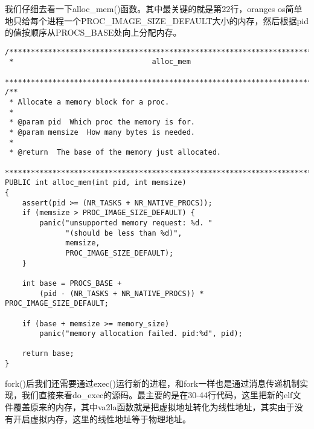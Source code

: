 \documentclass{whureport}
\begin{document}
我们仔细去看一下alloc\_mem()函数。其中最关键的就是第22行，oranges os简单地只给每个进程一个PROC\_IMAGE\_SIZE\_DEFAULT大小的内存，然后根据pid的值按顺序从PROCS\_BASE处向上分配内存。

\begin{lstlisting}
/*****************************************************************************
 *                                alloc_mem
 *****************************************************************************/
/**
 * Allocate a memory block for a proc.
 * 
 * @param pid  Which proc the memory is for.
 * @param memsize  How many bytes is needed.
 * 
 * @return  The base of the memory just allocated.
 *****************************************************************************/
PUBLIC int alloc_mem(int pid, int memsize)
{
	assert(pid >= (NR_TASKS + NR_NATIVE_PROCS));
	if (memsize > PROC_IMAGE_SIZE_DEFAULT) {
		panic("unsupported memory request: %d. "
		      "(should be less than %d)",
		      memsize,
		      PROC_IMAGE_SIZE_DEFAULT);
	}

	int base = PROCS_BASE +
		(pid - (NR_TASKS + NR_NATIVE_PROCS)) * PROC_IMAGE_SIZE_DEFAULT;

	if (base + memsize >= memory_size)
		panic("memory allocation failed. pid:%d", pid);

	return base;
}
\end{lstlisting}

fork()后我们还需要通过exec()运行新的进程，和fork一样也是通过消息传递机制实现，我们直接来看do\_exec的源码。最主要的是在30-44行代码，这里把新的elf文件覆盖原来的内存，其中va2la函数就是把虚拟地址转化为线性地址，其实由于没有开启虚拟内存，这里的线性地址等于物理地址。
\end{document}
